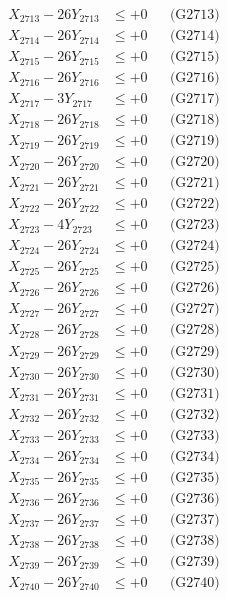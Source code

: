 \documentclass[a4paper,10pt]{article}
\begin{document}
{\begin{align}
X_{2713} - 26Y_{2713} &\leq +0 && \text{(G2713)} \\
X_{2714} - 26Y_{2714} &\leq +0 && \text{(G2714)} \\
X_{2715} - 26Y_{2715} &\leq +0 && \text{(G2715)} \\
X_{2716} - 26Y_{2716} &\leq +0 && \text{(G2716)} \\
X_{2717} - 3Y_{2717} &\leq +0 && \text{(G2717)} \\
X_{2718} - 26Y_{2718} &\leq +0 && \text{(G2718)} \\
X_{2719} - 26Y_{2719} &\leq +0 && \text{(G2719)} \\
X_{2720} - 26Y_{2720} &\leq +0 && \text{(G2720)} \\
\allowbreak
X_{2721} - 26Y_{2721} &\leq +0 && \text{(G2721)} \\
X_{2722} - 26Y_{2722} &\leq +0 && \text{(G2722)} \\
X_{2723} - 4Y_{2723} &\leq +0 && \text{(G2723)} \\
X_{2724} - 26Y_{2724} &\leq +0 && \text{(G2724)} \\
X_{2725} - 26Y_{2725} &\leq +0 && \text{(G2725)} \\
X_{2726} - 26Y_{2726} &\leq +0 && \text{(G2726)} \\
X_{2727} - 26Y_{2727} &\leq +0 && \text{(G2727)} \\
X_{2728} - 26Y_{2728} &\leq +0 && \text{(G2728)} \\
X_{2729} - 26Y_{2729} &\leq +0 && \text{(G2729)} \\
X_{2730} - 26Y_{2730} &\leq +0 && \text{(G2730)} \\
\allowbreak
X_{2731} - 26Y_{2731} &\leq +0 && \text{(G2731)} \\
X_{2732} - 26Y_{2732} &\leq +0 && \text{(G2732)} \\
X_{2733} - 26Y_{2733} &\leq +0 && \text{(G2733)} \\
X_{2734} - 26Y_{2734} &\leq +0 && \text{(G2734)} \\
X_{2735} - 26Y_{2735} &\leq +0 && \text{(G2735)} \\
X_{2736} - 26Y_{2736} &\leq +0 && \text{(G2736)} \\
X_{2737} - 26Y_{2737} &\leq +0 && \text{(G2737)} \\
X_{2738} - 26Y_{2738} &\leq +0 && \text{(G2738)} \\
X_{2739} - 26Y_{2739} &\leq +0 && \text{(G2739)} \\
X_{2740} - 26Y_{2740} &\leq +0 && \text{(G2740)} \\
\allowbreak

\end{align}}
\end{document}
